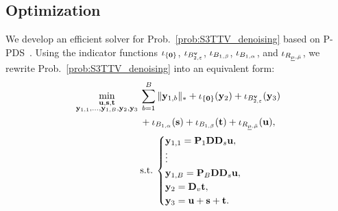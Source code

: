\documentclass[10pt,journal]{IEEEtran}
\begin{document}
\subsection{Optimization}
\label{subsec:Optim}
We develop an efficient solver for Prob.~\eqref{prob:S3TTV_denoising} based on P-PDS~\cite{Pock2011PPDS}.
Using the indicator functions $\iota_{\{ \mathbf{0} \}}$, $\iota_{B_{2, \varepsilon}^{\mathbf{v}}}$, $\iota_{B_{1, \beta}}$, $\iota_{B_{1, \alpha}}$, and $\iota_{R_{\underline{\mu},\bar{\mu}}}$, we rewrite Prob.~\eqref{prob:S3TTV_denoising} into an equivalent form:
\begin{align}
    \label{prob:denoising2PPDS}
    \min_{
    \substack{
        \mathbf{u}, \mathbf{s}, \mathbf{t}\\ 
        \mathbf{y}_{1,1}, \ldots , \mathbf{y}_{1,B}, 
        \mathbf{y}_{2}, \mathbf{y}_{3}}} \:
    & \sum_{b=1}^{B} \| 
    \mathbf{y}_{1, b} \|_{*}
    + \iota_{\{ \mathbf{0} \}} (\mathbf{y}_{2})
    + \iota_{B_{2, \varepsilon}^{\mathbf{v}}} (\mathbf{y}_{3}) \nonumber \\
    & + \iota_{B_{1, \alpha}} (\mathbf{s}) 
    + \iota_{B_{1, \beta}} (\mathbf{t})
    + \iota_{R_{\underline{\mu},\bar{\mu}}} (\mathbf{u}),  \nonumber \\
    & \mathrm{s.t.} \:
    \begin{cases} 
    \mathbf{y}_{1,1} = \mathbf{P}_{1} \mathbf{D} \mathbf{D}_{s} \mathbf{u}, \\ 
    \vdots \\ 
    \mathbf{y}_{1,B} = \mathbf{P}_{B} \mathbf{D} \mathbf{D}_{s} \mathbf{u}, \\ 
    \mathbf{y}_{2} = \mathbf{D}_{v} \mathbf{t}, \\
    \mathbf{y}_{3} = \mathbf{u} + \mathbf{s} + \mathbf{t}. 
    \end{cases}
\end{align}
\end{document}
